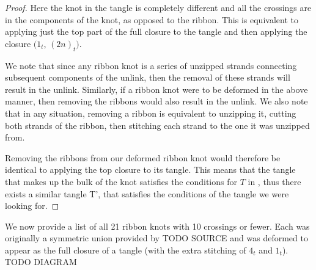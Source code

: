 \begin{paper}
\begin{proof}

Here the knot in the tangle is completely different and all the crossings are in
the components of the knot, as opposed to the ribbon.
This is equivalent to applying just the top part of the full closure to the
tangle and then applying the closure $(1_t$, $(2n)_t)$.


We note that since any ribbon knot is a series of unzipped strands connecting
subsequent components of the unlink, then the removal of these strands will
result in the unlink.
Similarly, if a ribbon knot were to be deformed in the above manner, then
removing the ribbons would also result in the unlink.
We also note that in any situation, removing a ribbon is equivalent to unzipping
it, cutting both strands of the ribbon, then stitching each strand to the one it
was unzipped from.


Removing the ribbons from our deformed ribbon knot would therefore be identical
to applying the top closure to its tangle.
This means that the tangle that makes up the bulk of the knot satisfies the
conditions for $T$ in \lemTangles, thus there exists a similar tangle T', that
satisfies the conditions of the tangle we were looking for.
\end{proof}
We now provide a list of all 21 ribbon knots with 10 crossings or fewer.
Each was originally a symmetric union provided by TODO SOURCE and was deformed
to appear as the full closure of a tangle (with the extra stitching of $4_t$ and
$1_t$).
TODO DIAGRAM


\end{paper}
